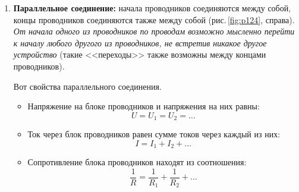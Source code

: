 \documentclass[main.tex]{subfiles}
\begin{document}
\begin{enumerate}
    Вот свойства последовательного соединения.
    \begin{itemize}
        \item Сила тока (кратко~--- ток) через блок проводников\footnote{Блок проводников~--- это группа соединенных между собой проводников (блок имеет два вывода, или конца). Такой блок можно рассматривать как один сложный проводник.} и токи через проводники равны:
        \begin{equation}
            I=I_1=I_2=\ldots
        \end{equation}
        \item Напряжение между концами блока проводников равно сумме напряжений на каждом проводнике:
        \begin{equation}
            U=U_1+U_2+\ldots
        \end{equation}
        \item Сопротивление блока проводников находят так: 
        \begin{equation}
            R=R_1+R_2+\ldots
        \end{equation}
    \end{itemize}
    
    
    
    \item \textbf{Параллельное соединение:} начала проводников соединяются между собой, концы проводников соединяются также между собой (рис.\,\ref{fig:p124}, справа). \emph{От начала одного из проводников по проводам возможно мысленно перейти к началу любого другого из проводников, не встретив никакое другое устройство} (такие <<переходы>> также возможны между концами проводников).

    Вот свойства параллельного соединения.
    \begin{itemize}
        \item Напряжение на блоке проводников и напряжения на них равны:
        \begin{equation}
            U=U_1=U_2=\ldots
        \end{equation}
        \item Ток через блок проводников равен сумме токов через каждый из них:
        \begin{equation}
            I=I_1+I_2+\ldots
        \end{equation}
        \item Сопротивление блока проводников находят из соотношения: 
        \begin{equation}
            \dfrac{1}{R}=\dfrac{1}{R_1}+\dfrac{1}{R_2}+\ldots
        \end{equation}
    \end{itemize}
    

\end{enumerate}
\end{document}

